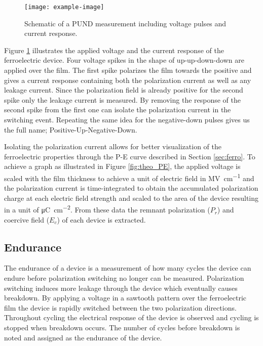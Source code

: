 \documentclass[11pt,twoside]{eitExjobb}
\begin{document}
\begin{figure}[htbp]
    \centering
    \texttt{[image: example-image]}
    \caption{Schematic of a PUND measurement including voltage pulses and
    current response.}
    \label{fig:char_PUND}
\end{figure}

Figure \ref{fig:char_PUND} illustrates the applied voltage and the current
response of the ferroelectric device. Four voltage spikes in the shape of
up-up-down-down are applied over the film. The first spike polarizes the film
towards the positive and gives a current response containing both the
polarization current as well as any leakage current. Since the polarization
field is already positive for the second spike only the leakage current is
measured. By removing the response of the second spike from the first one can
isolate the polarization current in the switching event. Repeating the same
idea for the negative-down pulses gives us the full name;
Positive-Up-Negative-Down.

Isolating the polarization current allows for better visualization of the
ferroelectric properties through the P-E curve described in Section
\ref{sec:ferro}. To achieve a graph as illustrated in Figure \ref{fig:theo_PE},
the applied voltage is scaled with the film thickness to achieve a unit of
electric field in \si{\mega\volt\per\centi\meter} and the polarization current
is time-integrated to obtain the accumulated polarization charge at each
electric field strength and scaled to the area of the device resulting in a
unit of \si{\micro\coulomb\per\centi\meter\squared}. From these data the
remnant polarization ($P_r$) and coercive field ($E_c$) of each device is
extracted.

\subsection{Endurance}\label{sec:Endu}
The endurance of a device is a measurement of how many cycles the device can
endure before polarization switching no longer can be measured. Polarization
switching induces more leakage through the device which eventually causes
breakdown. %
By applying a voltage in a sawtooth pattern over the ferroelectric film the
device is rapidly switched between the two polarization directions. Throughout
cycling the electrical response of the device is observed and cycling is
stopped when breakdown occurs. The number of cycles before breakdown is noted
and assigned as the endurance of the device.
\end{document}
